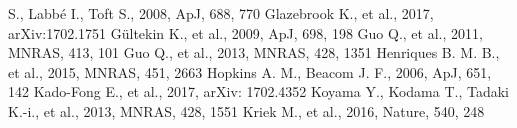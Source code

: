 \documentclass[useAMS,usenatbib]{mn2e}
\begin{document}
\begin{thebibliography}{}
S., Labb\'e I., Toft S., 2008, ApJ, 688, 770
 Glazebrook K., et al., 2017, arXiv:1702.1751
 G\"ultekin K., et al., 2009, ApJ, 698, 198
 Guo Q., et al., 2011, MNRAS, 413, 101
 Guo Q., et al., 2013, MNRAS, 428, 1351
 Henriques B. M. B., et al., 2015, MNRAS, 451, 2663
 Hopkins A. M., Beacom J. F., 2006, ApJ, 651, 142
 Kado-Fong E., et al., 2017, arXiv: 1702.4352
 Koyama Y., Kodama T., Tadaki K.-i., et al., 2013, MNRAS, 428, 1551
 Kriek M., et al., 2016, Nature, 540, 248

\end{thebibliography}
\end{document}
